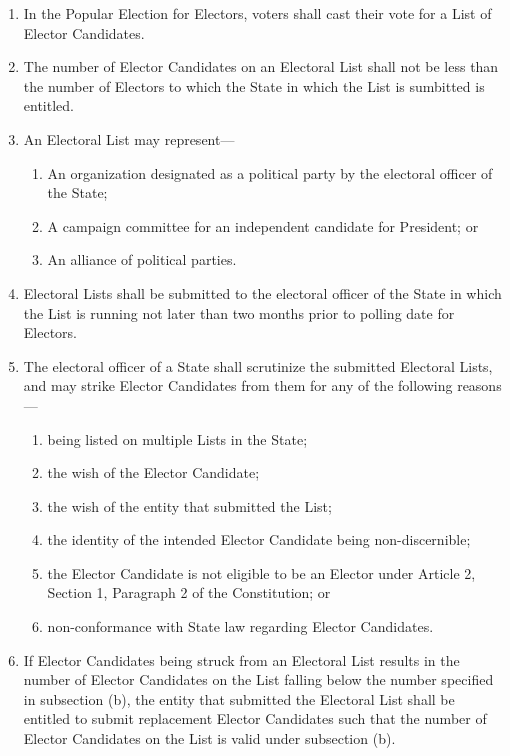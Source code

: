 \documentclass{article}
\begin{document}
    \begin{enumerate}
        \item In the Popular Election for Electors, voters shall cast their vote for a List of Elector Candidates.
        \item The number of Elector Candidates on an Electoral List shall not be less than the number of Electors to which the State in which the List is sumbitted is entitled.
        \item An Electoral List may represent---
        \begin{enumerate}
            \item An organization designated as a political party by the electoral officer of the State;
            \item A campaign committee for an independent candidate for President; or
            \item An alliance of political parties.
        \end{enumerate}
        \item Electoral Lists shall be submitted to the electoral officer of the State in which the List is running not later than two months prior to polling date for Electors.
        \item The electoral officer of a State shall scrutinize the submitted Electoral Lists, and may strike Elector Candidates from them for any of the following reasons---
        \begin{enumerate}
            \item being listed on multiple Lists in the State;
            \item the wish of the Elector Candidate;
            \item the wish of the entity that submitted the List;
            \item the identity of the intended Elector Candidate being non-discernible;
            \item the Elector Candidate is not eligible to be an Elector under Article 2, Section 1, Paragraph 2 of the Constitution; or
            \item non-conformance with State law regarding Elector Candidates.
        \end{enumerate}
        \item If Elector Candidates being struck from an Electoral List results in the number of Elector Candidates on the List falling below the number specified in subsection (b), the entity that submitted the Electoral List shall be entitled to submit replacement Elector Candidates such that the number of Elector Candidates on the List is valid under subsection (b).

\end{enumerate}
\end{document}
